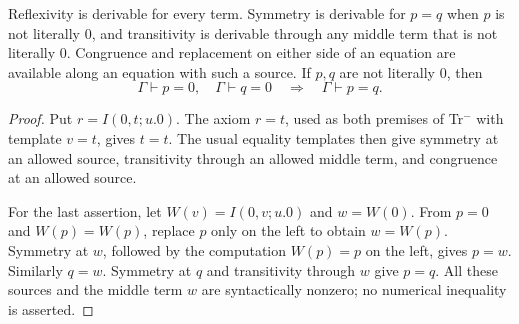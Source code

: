 \begin{lemma}\label{lem:safe-equality}
Reflexivity is derivable for every term.  Symmetry is derivable for $p=q$
when $p$ is not literally $0$, and transitivity is derivable through any
middle term that is not literally $0$.  Congruence and replacement on
either side of an equation are available along an equation with such a
source.  If $p,q$ are not literally $0$, then
\[
 \Gamma\vdash p=0,\quad\Gamma\vdash q=0
 \quad\Longrightarrow\quad\Gamma\vdash p=q.
 \tag{Zero join}\label{eq:zero-join}
\]
\end{lemma}
\begin{proof}
Put $r=I(0,t;u.0)$.  The axiom $r=t$, used as both premises of
Tr$^{-}$ with template $v=t$, gives $t=t$.  The usual equality
templates then give symmetry at an allowed source, transitivity through
an allowed middle term, and congruence at an allowed source.

For the last assertion, let $W(v)=I(0,v;u.0)$ and $w=W(0)$.  From
$p=0$ and $W(p)=W(p)$, replace $p$ only on the left to obtain
$w=W(p)$.  Symmetry at $w$, followed by the computation $W(p)=p$
on the left, gives $p=w$.  Similarly $q=w$.  Symmetry at $q$ and
transitivity through $w$ give $p=q$.  All these sources and the middle
term $w$ are syntactically nonzero; no numerical inequality is asserted.
\end{proof}

